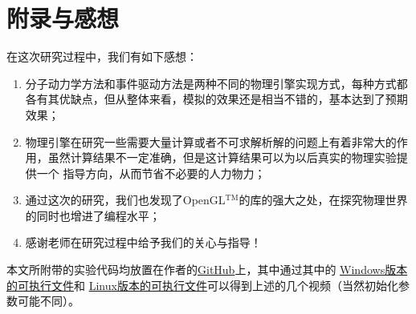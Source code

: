 ﻿\documentclass{article}
\begin{document}
	\section{附录与感想}
	\noindent 在这次研究过程中，我们有如下感想：
	\begin{enumerate}
		\item 分子动力学方法和事件驱动方法是两种不同的物理引擎实现方式，每种方式都各有其优缺点，但从整体来看，模拟的效果还是相当不错的，基本达到了预期效果；
		\item 物理引擎在研究一些需要大量计算或者不可求解析解的问题上有着非常大的作用，虽然计算结果不一定准确，但是这计算结果可以为以后真实的物理实验提供一个
		指导方向，从而节省不必要的人力物力；
		\item 通过这次的研究，我们也发现了OpenGL$^\text{TM}$的库的强大之处，在探究物理世界的同时也增进了编程水平；
		\item 感谢老师在研究过程中给予我们的关心与指导！
	\end{enumerate}
	本文所附带的实验代码均放置在作者的\href{https://github.com/PrayStarJirachi/OpenGL-Physical-Engine}{GitHub}上，其中通过其中的
	\href{https://github.com/PrayStarJirachi/OpenGL-Physical-Engine/Execuable/Windows}{Windows版本的可执行文件}和
	\href{https://github.com/PrayStarJirachi/OpenGL-Physical-Engine/Execuable/Linux}{Linux版本的可执行文件}可以得到上述的几个视频（当然初始化参数可能不同）。
	
	
	
\end{document}
